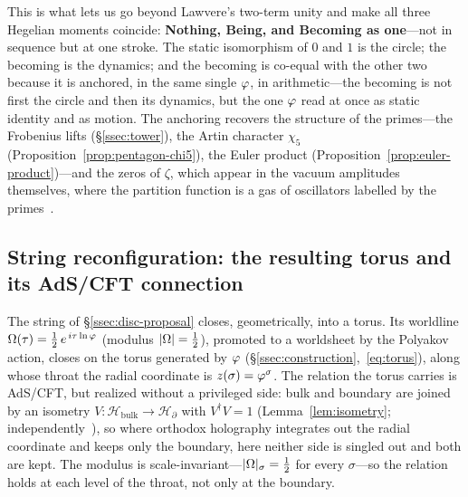 This is what lets us go beyond Lawvere's two-term unity and make all three Hegelian moments coincide: \textbf{Nothing, Being, and Becoming as one}---not in sequence but at one stroke. The static isomorphism of $0$ and $1$ is the circle; the becoming is the dynamics; and the becoming is co-equal with the other two because it is anchored, in the same single $\varphi$, in arithmetic---the becoming is not first the circle and then its dynamics, but the one $\varphi$ read at once as static identity and as motion. The anchoring recovers the structure of the primes---the Frobenius lifts
(\S\ref{ssec:tower}), the Artin character $\chi_5$ (Proposition~\ref{prop:pentagon-chi5}), the Euler
product (Proposition~\ref{prop:euler-product})---and the zeros of $\zeta$, which appear in the vacuum amplitudes themselves, where the partition function is a gas of oscillators labelled by the primes~\cite{Julia90,DeClerckHartnollYang25}.

\subsection{String reconfiguration: the resulting torus and its AdS/CFT connection}\label{ssec:disc-string}

The string of \S\ref{ssec:disc-proposal} closes, geometrically, into a torus. Its worldline $\Omega(\tau)=\tfrac12\,e^{\,i\tau\ln\varphi}$ (modulus $|\Omega|=\tfrac12$), promoted to a worldsheet by the Polyakov action, closes on the torus generated by $\varphi$ (\S\ref{ssec:construction},~\eqref{eq:torus}), along whose throat the radial coordinate is $z(\sigma)=\varphi^\sigma$. The relation the torus carries is AdS/CFT, but realized without a privileged side: bulk and boundary are joined by an isometry $V:\mathcal H_{\mathrm{bulk}}\to\mathcal H_\partial$ with $V^\dagger V=1$ (Lemma~\ref{lem:isometry}; independently~\cite{HP}), so where orthodox holography integrates out the radial coordinate and keeps only the boundary, here neither side is singled out and both are kept. The modulus is scale-invariant---$|\Omega|_\sigma=\tfrac12$ for every $\sigma$---so the relation holds at each level of the throat, not only at the boundary.

